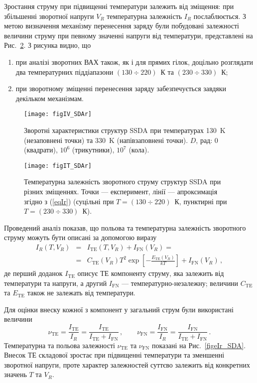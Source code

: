 Зростання струму при підвищенні температури залежить від зміщення:
при збільшенні зворотної напруги $V_R$ температурна залежність $I_R$ послаблюється.
З метою визначення механізму перенесення заряду були побудовані залежності величини струму при певному значенні напруги від температури,
представлені на Рис.~\ref{figIT_SDAr}.
З рисунка видно, що
\begin{enumerate}[label=\asbuk*),leftmargin=0em,itemindent=1.5em]
\item при аналізі зворотних ВАХ також, як і для прямих гілок, доцільно розглядати два температурних піддіапазони $(130\div220)$~К та $(230\div330)$~К;
\item при зворотному зміщенні перенесення заряду забезпечується завдяки декільком механізмам.
\end{enumerate}



\begin{figure}
\center
\texttt{[image: figIV\_SDAr]}
\caption{\label{figIV_SDAr}
Зворотні характеристики структур SSDA при температурах 130~K (незаповнені точки)
та 330~K (напівзаповнені точки).
$D$, рад: 0 (квадрати), $10^6$ (трикутники), $10^7$ (кола).
}%
\end{figure}


\begin{figure}
\center
\texttt{[image: figIT\_SDAr]}
\caption{\label{figIT_SDAr}
Температурна залежність зворотного струму структур SSDA при різних зміщеннях.
Точки --- експеримент, лінії --- апроксимація згідно з (\ref{eqIr})
(суцільні при $T=(130\div220)$~К, пунктирні при $T=(230\div330)$~К).
}%
\end{figure}

Проведений аналіз показав, що польова та температурна залежність зворотного струму можуть бути описані
за допомогою виразу
\begin{eqnarray}
\label{eqIr}
\nonumber I_R(T,V_R)&=&I_\mathrm{TE}(T,V_R)+I_\mathrm{FN}(V_R)=\\
&=&C_\mathrm{TE}(V_R)T^2\exp\left[-\frac{E_\mathrm{TE}(V_R)}{kT}\right]+I_\mathrm{FN}(V_R)\,,
\end{eqnarray}
де перший доданок $I_\mathrm{TE}$ описує ТЕ компоненту струму, яка залежить від температури та напруги,
а другий $I_\mathrm{FN}$ --- температурно-незалежну;
величини  $C_\mathrm{TE}$ та $E_\mathrm{TE}$ також не залежать від температури.

\label{nu_IR}
Для оцінки внеску кожної з компонент у загальний струм були використані величини
\begin{equation*}
 \nu_\mathrm{TE}=\frac{I_\mathrm{TE}}{I_R}=\frac{I_\mathrm{TE}}{I_\mathrm{TE}+I_\mathrm{FN}}\,,\qquad
 \nu_\mathrm{FN}=\frac{I_\mathrm{FN}}{I_R}=\frac{I_\mathrm{FN}}{I_\mathrm{TE}+I_\mathrm{FN}}\,.
\end{equation*}
Температурна та польова залежності $\nu_\mathrm{TE}$ та $\nu_\mathrm{FN}$ показані на Рис.~\ref{figeIr_SDA}.
Внесок ТЕ складової зростає при підвищенні температури та зменшенні зворотної напруги, проте характер
залежностей суттєво залежить від конкретних значень $T$ та $V_R$.


